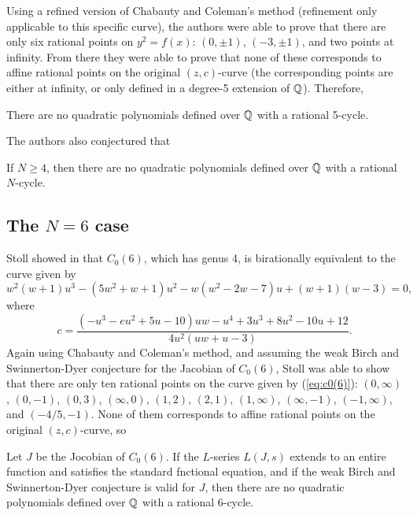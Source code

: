 Using a refined version of Chabauty and Coleman's method (refinement
only applicable to this specific curve), the authors were able to
prove that there are only six rational points on $y^2 = f(x)$: $(0,
\pm 1)$, $(-3, \pm 1)$, and two points at infinity. From there they
were able to prove that none of these corresponds to affine rational
points on the original $(z, c)$-curve (the corresponding points are
either at infinity, or only defined in a degree-5 extension of $\mathbb{Q}$).
Therefore,

\begin{theorem}
  There are no quadratic polynomials defined over $\mathbb{Q}$ with a rational
  5-cycle.
\end{theorem}

The authors also conjectured that

\begin{conjecture}
  If $N \ge 4$, then there are no quadratic polynomials defined over
  $\mathbb{Q}$ with a rational $N$-cycle.
\end{conjecture}

\subsection{The $N = 6$ case}

Stoll showed in \cite{MR2465796} that $C_0(6)$, which has genus 4, is
birationally equivalent to the curve given by
\begin{equation}
  \label{eq:c0(6)}
  w^2(w+1)u^3 - (5w^2+w+1)u^2 - w(w^2-2w-7)u + (w+1)(w-3) = 0,
\end{equation}
where
\begin{equation}
  \label{eq:c-in-uw}
  c = \frac{(-u^3-eu^2+5u-10)uw - u^4 + 3u^3 + 8u^2 - 10u +
    12}{4u^2(uw+u-3)}.
\end{equation}
Again using Chabauty and Coleman's method, and assuming the weak Birch
and Swinnerton-Dyer conjecture for the Jacobian of $C_0(6)$, Stoll was
able to show that there are only ten rational points on the curve
given by (\ref{eq:c0(6)}): $(0, \infty)$, $(0, -1)$, $(0, 3)$,
$(\infty, 0)$, $(1, 2)$, $(2, 1)$, $(1, \infty)$, $(\infty, -1)$,
$(-1, \infty)$, and $(-4/5, -1)$. None of them corresponds to affine
rational points on the original $(z, c)$-curve, so

\begin{theorem}
  Let $J$ be the Jocobian of $C_0(6)$. If the $L$-series $L(J,s)$
  extends to an entire function and satisfies the standard fnctional
  equation, and if the weak Birch and Swinnerton-Dyer conjecture is
  valid for $J$, then there are no quadratic polynomials defined over
  $\mathbb{Q}$ with a rational 6-cycle.
\end{theorem}

